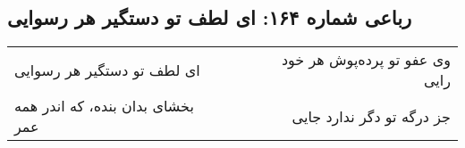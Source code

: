 \begin{center}
\section*{رباعی شماره ۱۶۴: ای لطف تو دستگیر هر رسوایی}
\label{sec:164}
\begin{longtable}{l p{0.5cm} r}
ای لطف تو دستگیر هر رسوایی
&&
وی عفو تو پرده‌پوش هر خود رایی
\\
بخشای بدان بنده، که اندر همه عمر
&&
جز درگه تو دگر ندارد جایی
\\
\end{longtable}
\end{center}
